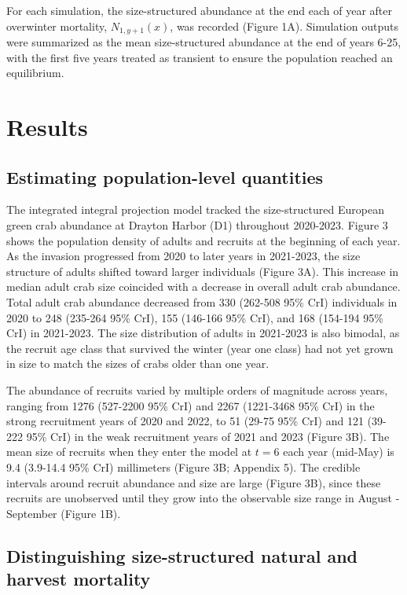 \documentclass{article}
\begin{document}
For each simulation, the size-structured abundance at the end each of year after overwinter mortality, $N_{1,y+1}(x)$, was recorded (Figure 1A). Simulation outputs were summarized as the mean size-structured abundance at the end of years 6-25, with the first five years treated as transient to ensure the population reached an equilibrium.

\section{Results}

\subsection{Estimating population-level quantities}

The integrated integral projection model tracked the size-structured European green crab abundance at Drayton Harbor (D1) throughout 2020-2023. Figure 3 shows the population density of adults and recruits at the beginning of each year. As the invasion progressed from 2020 to later years in 2021-2023, the size structure of adults shifted toward larger individuals (Figure 3A). This increase in median adult crab size coincided with a decrease in overall adult crab abundance. Total adult crab abundance decreased from 330 (262-508 95\% CrI) individuals in 2020 to 248 (235-264 95\% CrI), 155 (146-166 95\% CrI), and 168 (154-194 95\% CrI) in 2021-2023. The size distribution of adults in 2021-2023 is also bimodal, as the recruit age class that survived the winter (year one class) had not yet grown in size to match the sizes of crabs older than one year.

The abundance of recruits varied by multiple orders of magnitude across years, ranging from 1276 (527-2200 95\% CrI) and 2267 (1221-3468 95\% CrI) in the strong recruitment years of 2020 and 2022, to 51 (29-75 95\% CrI) and 121 (39-222 95\% CrI) in the weak recruitment years of 2021 and 2023 (Figure 3B). The mean size of recruits when they enter the model at $t = 6$ each year (mid-May) is 9.4 (3.9-14.4 95\% CrI) millimeters (Figure 3B; Appendix 5). The credible intervals around recruit abundance and size are large (Figure 3B), since these recruits are unobserved until they grow into the observable size range in August - September (Figure 1B).

\subsection{Distinguishing size-structured natural and harvest mortality}
\end{document}
